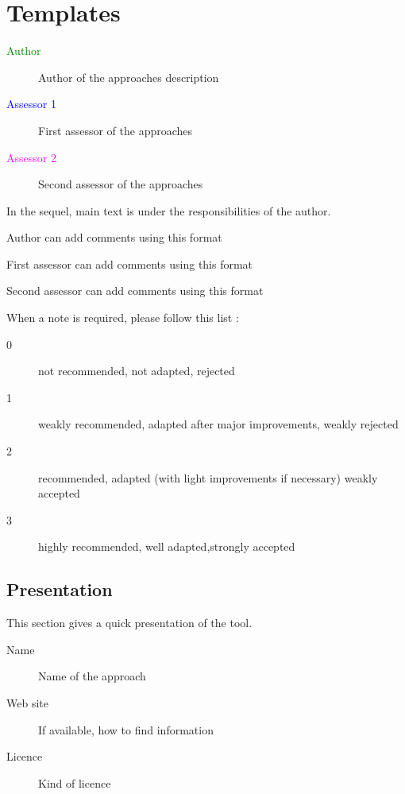 \chapter{Templates}

\begin{description}
\item[\textcolor{green}{Author}] Author of the approaches description  
\item[\textcolor{blue}{Assessor 1}] First assessor of the approaches 
\item[\textcolor{magenta}{Assessor 2}] Second assessor of the approaches 
\end{description}

In the sequel, main text is under the responsibilities of the author.

\begin{author_comment}
Author can add comments using this format
\end{author_comment}

\begin{assessor1}
First assessor can add comments using this format
\end{assessor1}

\begin{assessor2}
Second assessor can add comments using this format
\end{assessor2}

When a note is required, please follow this list :
\begin{description}
\item[0] not recommended, not adapted, rejected
\item[1] weakly recommended, adapted after major improvements, weakly rejected
\item[2] recommended, adapted (with light improvements if necessary)  weakly accepted
\item[3] highly recommended, well adapted,strongly accepted
\end{description}

\section{Presentation}
This section gives a quick presentation of the tool.

\begin{description}
\item[Name] Name of the approach
\item[Web site] If available, how to find information
\item[Licence] Kind of licence
\end{description}

